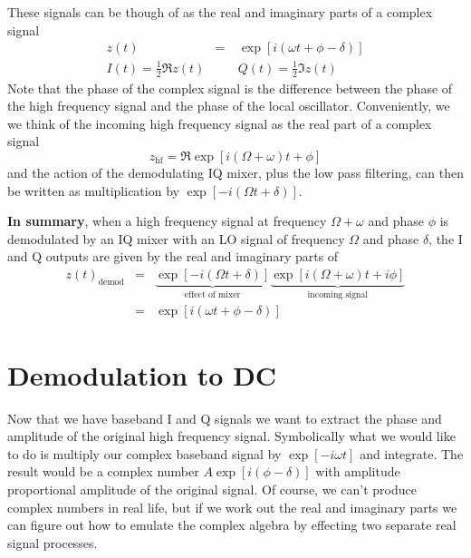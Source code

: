 These signals can be though of as the real and imaginary parts of a complex signal \begin{eqnarray}
z(t) &=& \exp \left[i \left( \omega t + \phi - \delta \right) \right] \\
I(t) = \frac{1}{2}\Re z(t) & \quad & Q(t) = \frac{1}{2}\Im z(t) \end{eqnarray}
Note that the phase of the complex signal is the difference between the phase of the high frequency signal and the phase of the local oscillator. Conveniently, we we think of the incoming high frequency signal as the real part of a complex signal \begin{equation}
z_{\textrm{hf}}=\Re \exp \left[ i \left( \Omega + \omega \right)t +\phi \right]  \end{equation}
and the action of the demodulating IQ mixer, plus the low pass filtering, can then be written as multiplication by $\exp \left[ -i( \Omega t + \delta ) \right]$.

\textbf{In summary}, when a high frequency signal at frequency $\Omega+\omega$ and phase $\phi$ is demodulated by an IQ mixer with an LO signal of frequency $\Omega$ and phase $\delta$, the I and Q outputs are given by the real and imaginary parts of \begin{eqnarray}
z(t)_{\textrm{demod}} &=& \underbrace{\exp \left[-i \left( \Omega t + \delta \right) \right]}_{\textrm{effect of mixer}} \underbrace{\exp \left[ i\left( \Omega + \omega \right) t + i \phi \right]}_{\textrm{incoming signal}} \nonumber \\
&=& \exp \left[ i \left( \omega t + \phi-\delta \right) \right] \nonumber \end{eqnarray}

\section{Demodulation to DC}

Now that we have baseband I and Q signals we want to extract the phase and amplitude of the original high frequency signal. Symbolically what we would like to do is multiply our complex baseband signal by $\exp \left[ -i \omega t \right]$ and integrate. The result would be a complex number $A \exp \left[ i \left( \phi - \delta \right) \right]$ with amplitude proportional amplitude of the original signal. Of course, we can't produce complex numbers in real life, but if we work out the real and imaginary parts we can figure out how to emulate the complex algebra by effecting two separate real signal processes.

